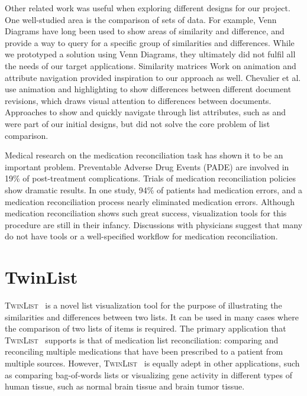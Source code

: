\documentclass{chi2009}
\newcommand{\TwinList}{\textsc{TwinList}}
\begin{document}
Other related work was useful when exploring different designs for our project. One well-studied area is the comparison of sets of data. For example, Venn Diagrams have long been used to show areas of similarity and difference, and provide a way to query for a specific group of similarities and differences\cite{kestler2005generalized}. While we prototyped a solution using Venn Diagrams, they ultimately did not fulfil all the needs of our target applications. Similarity matrices Work on animation and attribute navigation provided inspiration to our approach as well. Chevalier et al. \cite{diffmation10} use animation and highlighting to show differences between different document revisions, which draws visual attention to differences between documents. Approaches to show and quickly navigate through list attributes, such as \cite{Chimera:1992:VBI:142750.142817} and \cite{Masui98lensbar} were part of our initial designs, but did not solve the core problem of list comparison.

Medical research on the medication reconciliation task has shown it to be an important problem\cite{icutool03}. Preventable Adverse Drug Events (PADE) are involved in 19\% of post-treatment complications. Trials of medication reconciliation policies show dramatic results. In one study, 94\% of patients had medication errors, and a medication reconciliation process nearly eliminated medication errors\cite{icutool03}. Although medication reconciliation shows such great success, visualization tools for this procedure are still in their infancy. Discussions with physicians suggest that many do not have tools or a well-specified workflow for medication reconciliation. 

\section{TwinList}
\TwinList~ is a novel list visualization tool for the purpose of illustrating the similarities and differences between two lists. It can be used in many cases where the comparison of two lists of items is required. The primary application that \TwinList~ supports is that of medication list reconciliation: comparing and reconciling multiple medications that have been prescribed to a patient from multiple sources\cite{JCAHO-2006}. However, \TwinList~ is equally adept in other applications, such as comparing bag-of-words lists or visualizing gene activity in different types of human tissue, such as normal brain tissue and brain tumor tissue.
\end{document}
